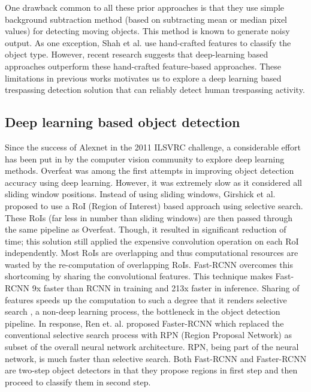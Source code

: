One drawback common to all these prior approaches is that they use simple background subtraction method (based on subtracting mean or median pixel values) for detecting moving objects. This method is known to generate noisy output\cite{stauffer1999adaptive}. As one exception, Shah et al.\cite{shah2007automated} use hand-crafted features to classify the object type. However, recent research suggests that deep-learning based approaches outperform these hand-crafted feature-based approaches\cite{benenson2014ten}. These limitations in previous works motivates us to explore a deep learning based trespassing detection solution that can reliably detect human trespassing activity. 

\subsection{Deep learning based object detection}
Since the success of Alexnet\cite{krizhevsky2012imagenet} in the 2011 ILSVRC\cite{russakovsky2015imagenet} challenge, a considerable effort has been put in by the computer vision community to explore deep learning methods. Overfeat\cite{sermanet2013overfeat} was among the first attempts in improving object detection accuracy using deep learning. However, it was extremely slow as it considered all sliding window positions. Instead of using sliding windows, Girshick et al.\cite{girshick2014rich} proposed to use a RoI (Region of Interest) based approach using selective search\cite{uijlings2013selective}. These RoIs (far less in number than sliding windows) are then passed through the same pipeline as Overfeat.  Though, it resulted in significant reduction of time; this solution still applied the expensive convolution operation on each RoI independently. Most RoIs are overlapping and thus computational resources are wasted by the re-computation of overlapping RoIs. Fast-RCNN\cite{ref_fastrcnn} overcomes this shortcoming by sharing the convolutional features. This technique makes Fast-RCNN 9x faster than RCNN\cite{girshick2014rich} in training and 213x faster in inference\cite{ref_fastrcnn}. Sharing of features speeds up the computation to such a degree that it renders selective search \cite{uijlings2013selective}, a non-deep learning process, the bottleneck in the object detection pipeline. In response, Ren et. al. proposed Faster-RCNN\cite{ref_fasterrcnn} which replaced the conventional selective search process with RPN (Region Proposal Network) as subset of the overall neural network architecture. RPN, being part of the neural network, is much faster than selective search. Both Fast-RCNN and Faster-RCNN are two-step object detectors in that they propose regions in first step and then proceed to classify them in second step.

